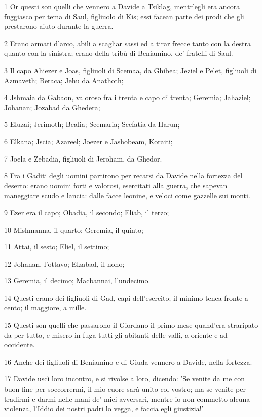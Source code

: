 \par 1 Or questi son quelli che vennero a Davide a Tsiklag, mentr'egli era ancora fuggiasco per tema di Saul, figliuolo di Kis; essi facean parte dei prodi che gli prestarono aiuto durante la guerra.
\par 2 Erano armati d'arco, abili a scagliar sassi ed a tirar frecce tanto con la destra quanto con la sinistra; erano della tribù di Beniamino, de' fratelli di Saul.
\par 3 Il capo Ahiezer e Joas, figliuoli di Scemaa, da Ghibea; Jeziel e Pelet, figliuoli di Azmaveth; Beraca; Jehu da Anathoth;
\par 4 Jshmaia da Gabaon, valoroso fra i trenta e capo di trenta; Geremia; Jahaziel; Johanan; Jozabad da Ghedera;
\par 5 Eluzai; Jerimoth; Bealia; Scemaria; Scefatia da Harun;
\par 6 Elkana; Jscia; Azareel; Joezer e Jashobeam, Koraiti;
\par 7 Joela e Zebadia, figliuoli di Jeroham, da Ghedor.
\par 8 Fra i Gaditi degli uomini partirono per recarsi da Davide nella fortezza del deserto: erano uomini forti e valorosi, esercitati alla guerra, che sapevan maneggiare scudo e lancia: dalle facce leonine, e veloci come gazzelle sui monti.
\par 9 Ezer era il capo; Obadia, il secondo; Eliab, il terzo;
\par 10 Mishmanna, il quarto; Geremia, il quinto;
\par 11 Attai, il sesto; Eliel, il settimo;
\par 12 Johanan, l'ottavo; Elzabad, il nono;
\par 13 Geremia, il decimo; Macbannai, l'undecimo.
\par 14 Questi erano dei figliuoli di Gad, capi dell'esercito; il minimo tenea fronte a cento; il maggiore, a mille.
\par 15 Questi son quelli che passarono il Giordano il primo mese quand'era straripato da per tutto, e misero in fuga tutti gli abitanti delle valli, a oriente e ad occidente.
\par 16 Anche dei figliuoli di Beniamino e di Giuda vennero a Davide, nella fortezza.
\par 17 Davide uscì loro incontro, e si rivolse a loro, dicendo: 'Se venite da me con buon fine per soccorrermi, il mio cuore sarà unito col vostro; ma se venite per tradirmi e darmi nelle mani de' miei avversari, mentre io non commetto alcuna violenza, l'Iddio dei nostri padri lo vegga, e faccia egli giustizia!'
